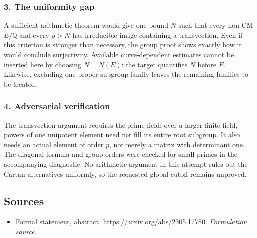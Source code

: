 \documentclass[11pt]{article}
\begin{document}
\subsubsection{3. The uniformity gap}
A sufficient arithmetic theorem would give one bound $N$ such that every non-CM $E/\mathbb Q$ and every $p>N$ has irreducible image containing a transvection. Even if this criterion is stronger than necessary, the group proof shows exactly how it would conclude surjectivity. Available curve-dependent estimates cannot be inserted here by choosing $N=N(E)$: the target quantifies $N$ before $E$. Likewise, excluding one proper subgroup family leaves the remaining families to be treated.

\subsubsection{4. Adversarial verification}
The transvection argument requires the prime field: over a larger finite field, powers of one unipotent element need not fill its entire root subgroup. It also needs an actual element of order $p$, not merely a matrix with determinant one. The diagonal formula and group orders were checked for small primes in the accompanying diagnostic. No arithmetic argument in this attempt rules out the Cartan alternatives uniformly, so the requested global cutoff remains unproved.

\subsection{Sources}
\begin{itemize}
\item[S1]Formal statement, abstract.
\url{https://arxiv.org/abs/2305.17780}.
\textit{Formulation source.}
\end{itemize}
\end{document}

